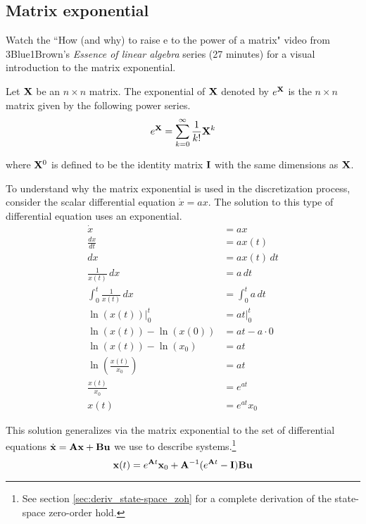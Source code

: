 \subsection{Matrix exponential}
\begin{remark}
  Watch the ``How (and why) to raise e to the power of a matrix" video from
  3Blue1Brown's \textit{Essence of linear algebra} series (27 minutes)
  \cite{bib:linalg_matrix_exp} for a visual introduction to the matrix
  exponential.
\end{remark}
\begin{definition}
  Let $\mathbf{X}$ be an $n \times n$ matrix. The exponential of $\mathbf{X}$ denoted
  by $e^{\mathbf{X}}$ is the $n \times n$ matrix given by the following power
  series.
  \begin{equation}
    e^{\mathbf{X}} = \sum_{k=0}^\infty \frac{1}{k!} \mathbf{X}^k \label{eq:mat_exp}
  \end{equation}

  where $\mathbf{X}^0$ is defined to be the identity matrix $\mathbf{I}$ with the same
  dimensions as $\mathbf{X}$.
\end{definition}

To understand why the matrix exponential is used in the \gls{discretization}
process, consider the scalar differential equation $\dot{x} = ax$. The solution
to this type of differential equation uses an exponential.
\begin{align*}
  \dot{x} &= ax \\
  \frac{dx}{dt} &= ax(t) \\
  dx &= ax(t) \,dt \\
  \frac{1}{x(t)} \,dx &= a \,dt \\
  \int_0^t \frac{1}{x(t)} \,dx &= \int_0^t a \,dt \\
  \ln(x(t)) \rvert_0^t &= at \rvert_0^t \\
  \ln(x(t)) - \ln(x(0)) &= at - a \cdot 0 \\
  \ln(x(t)) - \ln(x_0) &= at \\
  \ln\left(\frac{x(t)}{x_0}\right) &= at \\
  \frac{x(t)}{x_0} &= e^{at} \\
  x(t) &= e^{at} x_0
\end{align*}

This solution generalizes via the matrix exponential to the set of differential
equations $\dot{\mathbf{x}} = \mathbf{A}\mathbf{x} + \mathbf{B}\mathbf{u}$ we use to describe
\glspl{system}.\footnote{See section \ref{sec:deriv_state-space_zoh} for a
complete derivation of the state-space zero-order hold.}
\begin{equation*}
  \mathbf{x}(t) = e^{\mathbf{A}t} \mathbf{x}_0 +
    \mathbf{A}^{-1}(e^{\mathbf{A}t} - \mathbf{I})\mathbf{B} \mathbf{u}
\end{equation*}

